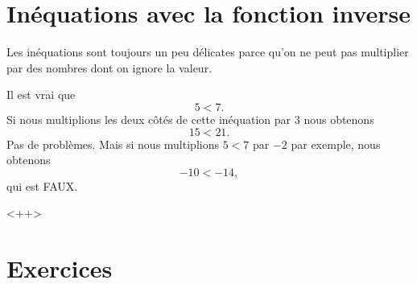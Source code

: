 \section{Inéquations avec la fonction inverse}

Les inéquations sont toujours un peu délicates parce qu'on ne peut pas multiplier par des nombres dont on ignore la valeur.

\begin{example}
    Il est vrai que
    \begin{equation}
        5<7.
    \end{equation}
    Si nous multiplions les deux côtés de cette inéquation par \( 3\) nous obtenons
    \begin{equation}
        15<21.
    \end{equation}
    Pas de problèmes. Mais si nous multiplions \( 5<7\) par \( -2\) par exemple, nous obtenons
    \begin{equation}
        -10 < -14,
    \end{equation}
    qui est FAUX.
\end{example}
<++>

\section{Exercices}



